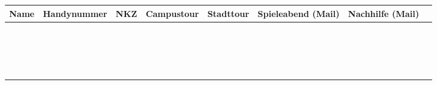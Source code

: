 \documentclass{article}
\begin{document}
\renewcommand{\arraystretch}{2}
\begin{table}[ht!]
  \begin{center}
    \begin{tabular}{|p{7cm}|p{5cm}|p{3cm}|c|c|c|c|c|} 
    	\toprule
      \textbf{Name} & \textbf{Handynummer} & \textbf{NKZ} & \textbf{Campustour} & \textbf{Stadttour} & \textbf{Spieleabend (Mail)} & \textbf{Nachhilfe (Mail)} \\
      \midrule 
      & & & & & &   \\ \hline
      & & & & & &   \\ \hline
      & & & & & &   \\ \hline
      & & & & & &   \\ \hline
      & & & & & &   \\ \hline
      & & & & & &   \\ \hline
      & & & & & &   \\ \hline
      & & & & & &   \\ \hline
      & & & & & &   \\ \hline
      & & & & & &   \\ \hline
      & & & & & &   \\ \hline
      & & & & & &   \\ \hline
      & & & & & &   \\ \hline
      & & & & & &   \\ \hline
      & & & & & &   \\ \hline
      & & & & & &   \\ \hline
      & & & & & &   \\ \hline
      & & & & & &   \\
      \bottomrule
    \end{tabular}
  \end{center}
\end{table}
\end{document}
